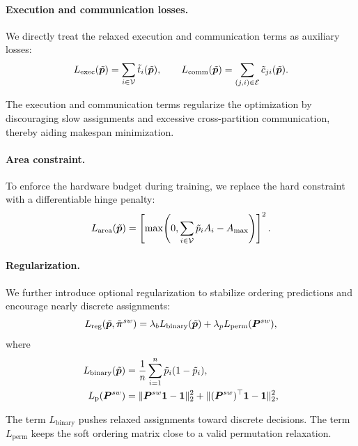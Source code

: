 \paragraph{\textbf{Execution and communication losses.}}
We directly treat the relaxed execution and communication terms as auxiliary losses:
\begin{equation}
L_{\mathrm{exec}}(\tilde{{\bm{p}}}) = \sum_{i\in{\mathcal{V}}}\tilde{t}_i(\tilde{{\bm{p}}}),
\qquad
L_{\mathrm{comm}}(\tilde{{\bm{p}}}) = \sum_{(j,i)\in{\mathcal{E}}}\tilde{c}_{ji}(\tilde{{\bm{p}}}).
\end{equation}

The execution and communication terms regularize the optimization by discouraging slow assignments and excessive cross-partition communication, thereby aiding makespan minimization.

\paragraph{\textbf{Area constraint.}}
To enforce the hardware budget during training, we replace the hard constraint with a differentiable hinge penalty:
\begin{equation}
L_{\mathrm{area}}(\tilde{{\bm{p}}})
=
\left[
\max\!\left(
0,\sum_{i\in{\mathcal{V}}}\tilde{p}_i A_i - A_{\max}
\right)
\right]^2.
\end{equation}

\paragraph{\textbf{Regularization.}}
We further introduce optional regularization to stabilize ordering predictions and encourage nearly discrete assignments:
\begin{equation}
L_{\mathrm{reg}}(\tilde{{\bm{p}}},\tilde{\bm{\pi}}^{sw})
=
\lambda_b L_{\mathrm{binary}}(\tilde{{\bm{p}}})
+
\lambda_p L_{\mathrm{perm}}({\bm{P}}^{sw}),
\end{equation}
where
\begin{align}
L_{\mathrm{binary}}(\tilde{{\bm{p}}})
&=
\frac{1}{n}\sum_{i=1}^n \tilde{p}_i(1-\tilde{p}_i),\\
L_{\mathrm{p}}({\bm{P}}^{sw})
&=
\|{\bm{P}}^{sw}\mathbf{1}-\mathbf{1}\|_2^2
+
\|({\bm{P}}^{sw})^\top\mathbf{1}-\mathbf{1}\|_2^2,
\\
\end{align}

The term $L_{\mathrm{binary}}$ pushes relaxed assignments toward discrete decisions. 
The term $L_{\mathrm{perm}}$ keeps the soft ordering matrix close to a valid permutation relaxation. 

